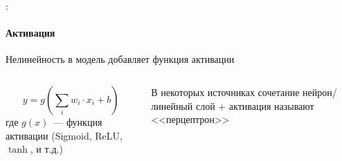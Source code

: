 \documentclass{beamer}
\begin{document}
\begin{frame}{\secname : \subsecname}
  \framesubtitle{Активация}
  Нелинейность в модель добавляет функция активации

  \begin{columns}

    \begin{column}{0.5\textwidth}

      $$
      y = g\left(\sum_{i}^{} w_i \cdot x_i + b\right)
      $$
      где $g(x)$~--- функция активации (Sigmoid, ReLU, $\tanh$, и т.д.)

    \end{column}

    \begin{column}{0.5\textwidth}
      \begin{center}
      \end{center}
      В некоторых источниках сочетание нейрон/линейный слой +
      активация называют <<перцептрон>>
    \end{column}

  \end{columns}
\end{frame}
\end{document}
